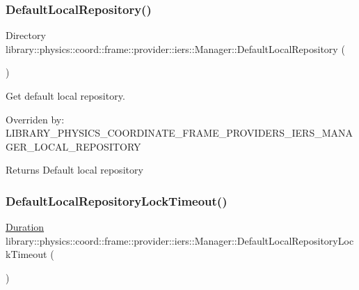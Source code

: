 \subsubsection{\texorpdfstring{Default\+Local\+Repository()}{DefaultLocalRepository()}}
{\footnotesize\ttfamily Directory library\+::physics\+::coord\+::frame\+::provider\+::iers\+::\+Manager\+::\+Default\+Local\+Repository (\begin{DoxyParamCaption}{ }\end{DoxyParamCaption})\hspace{0.3cm}{\ttfamily [static]}}



Get default local repository. 

Overriden by\+: L\+I\+B\+R\+A\+R\+Y\+\_\+\+P\+H\+Y\+S\+I\+C\+S\+\_\+\+C\+O\+O\+R\+D\+I\+N\+A\+T\+E\+\_\+\+F\+R\+A\+M\+E\+\_\+\+P\+R\+O\+V\+I\+D\+E\+R\+S\+\_\+\+I\+E\+R\+S\+\_\+\+M\+A\+N\+A\+G\+E\+R\+\_\+\+L\+O\+C\+A\+L\+\_\+\+R\+E\+P\+O\+S\+I\+T\+O\+RY

\begin{DoxyReturn}{Returns}
Default local repository 
\end{DoxyReturn}
\mbox{\label{classlibrary_1_1physics_1_1coord_1_1frame_1_1provider_1_1iers_1_1_manager_a63300991a534897cc3e850e58876f62b}} 
\subsubsection{\texorpdfstring{Default\+Local\+Repository\+Lock\+Timeout()}{DefaultLocalRepositoryLockTimeout()}}
{\footnotesize\ttfamily \hyperlink{classlibrary_1_1physics_1_1time_1_1_duration}{Duration} library\+::physics\+::coord\+::frame\+::provider\+::iers\+::\+Manager\+::\+Default\+Local\+Repository\+Lock\+Timeout (\begin{DoxyParamCaption}{ }\end{DoxyParamCaption})\hspace{0.3cm}{\ttfamily [static]}}



